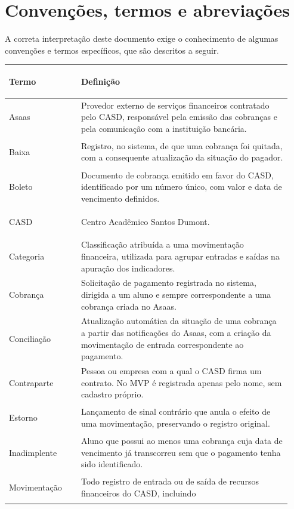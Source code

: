 \documentclass[11pt,a4paper,oneside]{report}
\begin{document}
\section*{Convenções, termos e abreviações}

A correta interpretação deste documento exige o conhecimento de algumas convenções e termos
específicos, que são descritos a seguir.

\begin{longtable}{@{}>{\bfseries\raggedright\arraybackslash}p{0.24\linewidth} p{0.70\linewidth}@{}}
  \toprule
  \textmd{\textbf{Termo}} & \textbf{Definição} \\
  \midrule
  \endhead
  Asaas & Provedor externo de serviços financeiros contratado pelo CASD, responsável pela emissão
          das cobranças e pela comunicação com a instituição bancária. \\
  Baixa & Registro, no sistema, de que uma cobrança foi quitada, com a consequente atualização da
          situação do pagador. \\
  Boleto & Documento de cobrança emitido em favor do CASD, identificado por um número único, com
           valor e data de vencimento definidos. \\
  CASD & Centro Acadêmico Santos Dumont. \\
  Categoria & Classificação atribuída a uma movimentação financeira, utilizada para agrupar
              entradas e saídas na apuração dos indicadores. \\
  Cobrança & Solicitação de pagamento registrada no sistema, dirigida a um aluno e sempre
             correspondente a uma cobrança criada no Asaas. \\
  Conciliação & Atualização automática da situação de uma cobrança a partir das notificações do
                Asaas, com a criação da movimentação de entrada correspondente ao pagamento. \\
  Contraparte & Pessoa ou empresa com a qual o CASD firma um contrato. No MVP é registrada apenas
                pelo nome, sem cadastro próprio. \\
  Estorno & Lançamento de sinal contrário que anula o efeito de uma movimentação, preservando o
            registro original. \\
  Inadimplente & Aluno que possui ao menos uma cobrança cuja data de vencimento já transcorreu sem
                 que o pagamento tenha sido identificado. \\
  Movimentação & Todo registro de entrada ou de saída de recursos financeiros do CASD, incluindo

\end{longtable}
\end{document}
